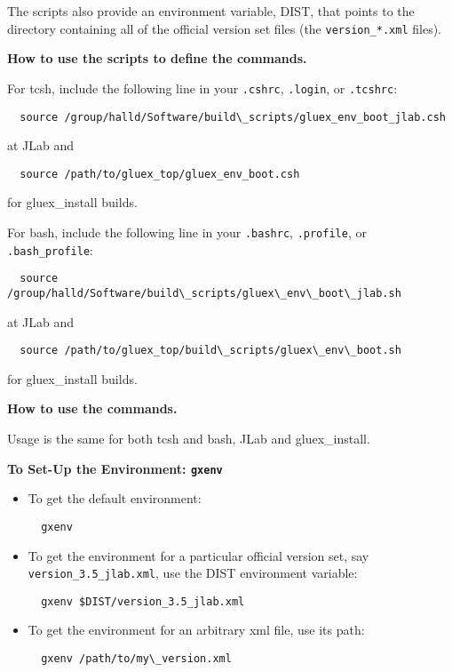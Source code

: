 \documentclass[12pt]{article}
\begin{document}
The scripts also provide an environment variable, DIST, that points to
the directory containing all of the official version set files (the
{\tt version\_*.xml} files).

\begin{description}
\item{\bf How to use the scripts to define the commands.}

For tcsh, include the following line in your {\tt .cshrc}, {\tt .login}, or {\tt .tcshrc}:
\begin{verbatim}
  source /group/halld/Software/build\_scripts/gluex_env_boot_jlab.csh
\end{verbatim}
at JLab and
\begin{verbatim}
  source /path/to/gluex_top/gluex_env_boot.csh
\end{verbatim}
for gluex\_install builds.

For bash, include the following line in your {\tt .bashrc}, {\tt .profile}, or {\tt .bash\_profile}:
\begin{verbatim}
  source /group/halld/Software/build\_scripts/gluex\_env\_boot\_jlab.sh
\end{verbatim}
at JLab and
\begin{verbatim}
  source /path/to/gluex_top/build\_scripts/gluex\_env\_boot.sh
\end{verbatim}
for gluex\_install builds.

\item{\bf How to use the commands.}

Usage is the same for both tcsh and bash, JLab and gluex\_install.

\begin{description}
\item{\bf To Set-Up the Environment: {\tt gxenv}}

\begin{itemize}
\item To get the default environment:
\begin{verbatim}
  gxenv
\end{verbatim}
\item To get the environment for a particular official version set, say {\tt version\_3.5\_jlab.xml}, use the {DIST} environment variable:
\begin{verbatim}
  gxenv $DIST/version_3.5_jlab.xml
\end{verbatim}
\item To get the environment for an arbitrary xml file, use its path:
\begin{verbatim}
  gxenv /path/to/my\_version.xml
\end{verbatim}
\end{itemize}


\end{description}
\end{description}
\end{document}
